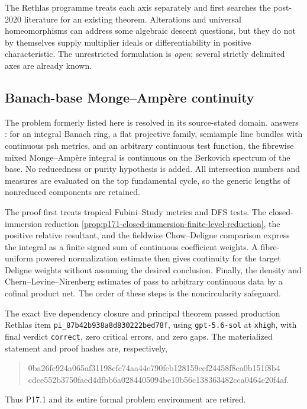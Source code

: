 The Rethlas programme treats each axis separately and first searches the
post-2020 literature for an existing theorem.  Alterations and universal
homeomorphisms can address some algebraic descent questions, but they do not
by themselves supply multiplier ideals or differentiability in positive
characteristic.  The unrestricted formulation is \emph{open}; several
strictly delimited axes are already known.

\subsection{Banach-base Monge--Amp\`ere continuity}
\label{sec:ch72-banach-resolved}

The problem formerly listed here is resolved in its source-stated domain.
 answers
\cite[Question~4.9]{PS23Hybrid}: for an integral Banach ring, a flat
projective family, semiample line bundles with continuous psh metrics, and
an arbitrary continuous test function, the fibrewise mixed
Monge--Amp\`ere integral is continuous on the Berkovich spectrum of the
base.  No reducedness or purity hypothesis is added.  All intersection
numbers and measures are evaluated on the top fundamental cycle, so the
generic lengths of nonreduced components are retained.

The proof first treats tropical Fubini--Study metrics and DFS tests.  The
closed-immersion reduction
\cref{prop:p171-closed-immersion-finite-level-reduction}, the positive
relative resultant, and the fieldwise Chow--Deligne comparison express the
integral as a finite signed sum of continuous coefficient weights.  A
fibre-uniform powered normalization estimate then gives continuity for the
target Deligne weights without assuming the desired conclusion.  Finally,
the density and Chern--Levine--Nirenberg estimates of
\cite[Lemma~4.10]{PS23Hybrid} pass to arbitrary continuous data by a cofinal product
net.  The order of these steps is the noncircularity safeguard.

The exact live dependency closure and principal theorem passed production
Rethlas item \texttt{pi\_87b42b938a8d830222bed78f}, using
\texttt{gpt-5.6-sol} at \texttt{xhigh}, with final verdict
\texttt{correct}, zero critical errors, and zero gaps.  The materialized
statement and proof hashes are, respectively,
\begin{quote}
\small\ttfamily
0ba26fe924a065af31198cfc74aa44e790feb128159eef24458f8ca0b151f8b4\\
cdce552b3750faed4dfbb6a0284405094be10b56c138363482cca0464e20f4af.
\end{quote}
Thus P17.1 and its entire formal problem environment are retired.

